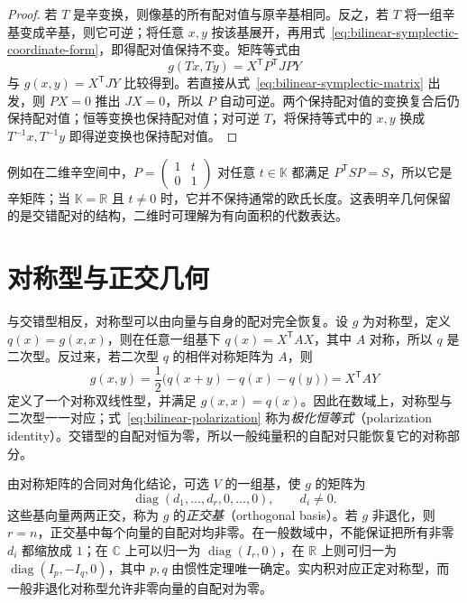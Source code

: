 \begin{proof}
若 $T$ 是辛变换，则像基的所有配对值与原辛基相同。反之，若 $T$ 将一组辛基变成辛基，则它可逆；将任意 $x,y$ 按该基展开，再用式~\eqref{eq:bilinear-symplectic-coordinate-form}，即得配对值保持不变。矩阵等式由
\[
    g(Tx,Ty)=X^{\mathsf T}P^{\mathsf T}JPY
\]
与 $g(x,y)=X^{\mathsf T}JY$ 比较得到。若直接从式~\eqref{eq:bilinear-symplectic-matrix} 出发，则 $PX=0$ 推出 $JX=0$，所以 $P$ 自动可逆。两个保持配对值的变换复合后仍保持配对值；恒等变换也保持配对值；对可逆 $T$，将保持等式中的 $x,y$ 换成 $T^{-1}x,T^{-1}y$ 即得逆变换也保持配对值。
\end{proof}

例如在二维辛空间中，$P=\begin{pmatrix}1&t\\0&1\end{pmatrix}$ 对任意 $t\in\mathbb K$ 都满足 $P^{\mathsf T}SP=S$，所以它是辛矩阵；当 $\mathbb K=\mathbb R$ 且 $t\neq0$ 时，它并不保持通常的欧氏长度。这表明辛几何保留的是交错配对的结构，二维时可理解为有向面积的代数表达。

\section{对称型与正交几何}
\label{sec:bilinear-orthogonal-geometry}

与交错型相反，对称型可以由向量与自身的配对完全恢复。设 $g$ 为对称型，定义 $q(x)=g(x,x)$，则在任意一组基下 $q(x)=X^{\mathsf T}AX$，其中 $A$ 对称，所以 $q$ 是二次型。反过来，若二次型 $q$ 的相伴对称矩阵为 $A$，则
\begin{equation}
\label{eq:bilinear-polarization}
    g(x,y)=\frac12\bigl(q(x+y)-q(x)-q(y)\bigr)
    =X^{\mathsf T}AY
\end{equation}
定义了一个对称双线性型，并满足 $g(x,x)=q(x)$。因此在数域上，对称型与二次型一一对应；式~\eqref{eq:bilinear-polarization} 称为\emph{极化恒等式}（polarization identity）。交错型的自配对恒为零，所以一般纯量积的自配对只能恢复它的对称部分。

由对称矩阵的合同对角化结论，可选 $V$ 的一组基，使 $g$ 的矩阵为
\[
    \operatorname{diag}(d_1,\ldots,d_r,0,\ldots,0),\qquad d_i\neq0.
\]
这些基向量两两正交，称为 $g$ 的\emph{正交基}（orthogonal basis）。若 $g$ 非退化，则 $r=n$，正交基中每个向量的自配对均非零。在一般数域中，不能保证把所有非零 $d_i$ 都缩放成 $1$；在 $\mathbb C$ 上可以归一为 $\operatorname{diag}(I_r,0)$，在 $\mathbb R$ 上则可归一为 $\operatorname{diag}(I_p,-I_q,0)$，其中 $p,q$ 由惯性定理唯一确定。实内积对应正定对称型，而一般非退化对称型允许非零向量的自配对为零。

